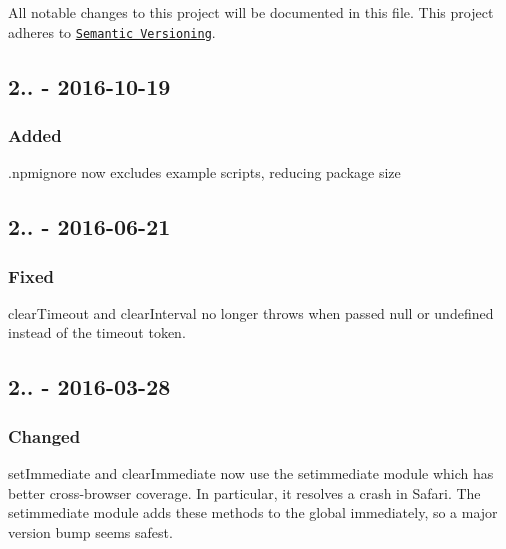 All notable changes to this project will be documented in this file. This project adheres to \href{http://semver.org/}{\tt Semantic Versioning}.

\subsection*{2.. -\/ 2016-\/10-\/19}

\subsubsection*{Added}


\begin{DoxyItemize}
\item {\ttfamily .npmignore} now excludes example scripts, reducing package size
\end{DoxyItemize}

\subsection*{2.. -\/ 2016-\/06-\/21}

\subsubsection*{Fixed}


\begin{DoxyItemize}
\item {\ttfamily clear\+Timeout} and {\ttfamily clear\+Interval} no longer throws when passed null or undefined instead of the timeout token.
\end{DoxyItemize}

\subsection*{2.. -\/ 2016-\/03-\/28}

\subsubsection*{Changed}


\begin{DoxyItemize}
\item {\ttfamily set\+Immediate} and {\ttfamily clear\+Immediate} now use the {\ttfamily setimmediate} module which has better cross-\/browser coverage. In particular, it resolves a crash in Safari. The {\ttfamily setimmediate} module adds these methods to the global immediately, so a major version bump seems safest.
\end{DoxyItemize}

